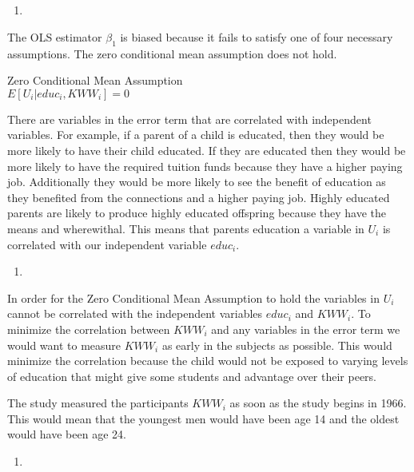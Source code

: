 \documentclass[
  12pt,
  landscape]{article}
\begin{document}
\begin{enumerate}
\def\labelenumi{(\alph{enumi})}
\setcounter{enumi}{1}
\item
\end{enumerate}

The OLS estimator \(\hat{\beta_1}\) is biased because it fails to
satisfy one of four necessary assumptions. The zero conditional mean
assumption does not hold.

\begin{center}
Zero Conditional Mean Assumption
\\
${E[U_i| educ_i, KWW_i] = 0}$
\end{center}

There are variables in the error term that are correlated with
independent variables. For example, if a parent of a child is educated,
then they would be more likely to have their child educated. If they are
educated then they would be more likely to have the required tuition
funds because they have a higher paying job. Additionally they would be
more likely to see the benefit of education as they benefited from the
connections and a higher paying job. Highly educated parents are likely
to produce highly educated offspring because they have the means and
wherewithal. This means that parents education a variable in \({U_i}\)
is correlated with our independent variable \({educ_i}\).

\begin{enumerate}
\def\labelenumi{(\alph{enumi})}
\setcounter{enumi}{2}
\item
\end{enumerate}

In order for the Zero Conditional Mean Assumption to hold the variables
in \({U_i}\) cannot be correlated with the independent variables
\({educ_i}\) and \({KWW_i}\). To minimize the correlation between
\({KWW_i}\) and any variables in the error term we would want to measure
\({KWW_i}\) as early in the subjects as possible. This would minimize
the correlation because the child would not be exposed to varying levels
of education that might give some students and advantage over their
peers.

The study measured the participants \({KWW_i}\) as soon as the study
begins in 1966. This would mean that the youngest men would have been
age 14 and the oldest would have been age 24.

\begin{enumerate}
\def\labelenumi{(\alph{enumi})}
\setcounter{enumi}{3}
\item
\end{enumerate}
\end{document}

